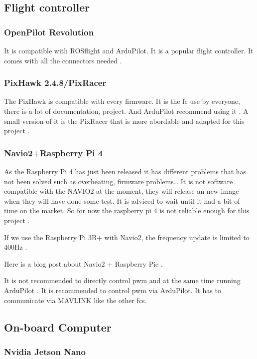 \subsection{Flight controller}
\subsubsection{OpenPilot Revolution}
It is compatible with ROSflight and ArduPilot. It is a popular flight controller.
It comes with all the connectors needed \cite{bangood_revo}.


\subsubsection{PixHawk 2.4.8/PixRacer}
The PixHawk is compatible with every firmware.
It is the \gls{fc} use by everyone, there is a lot of documentation, project. And ArduPilot recommend using it \cite{ardupilot_choose_fc}.
A small version of it is the PixRacer that is more abordable and adapted for this project \cite{mrobotics_pixracer}.

\subsubsection{Navio2+Raspberry Pi 4}
As the Raspberry Pi 4 has just been released it has different problems that has not been solved such as overheating, firmware problems… It is not software compatible with the NAVIO2 at the moment, they will release an new image when they will have done some test. It is adviced to wait until it had a bit of time on the market. So for now the raspberry pi 4 is not reliable enough for this project \cite{ardupilot_rpi_compatibility}.

If we use the Raspberry Pi 3B+ with Navio2, the frequency update is limited to 400Hz \cite{emlid_pwm_frequency}.

Here is a blog post about Navio2 + Raspberry Pie \cite{dojofordrones_rpi_drone}.

It is not recommended to directly control pwm and at the same time running ArduPilot \cite{emlid_servo_control}. It is recommended to control pwm via ArduPilot. It has to communicate via MAVLINK like the other \glspl{fc}.

\subsection{On-board Computer}
\subsubsection{Nvidia Jetson Nano}

